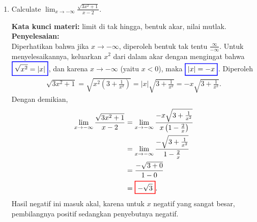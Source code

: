 \documentclass[10pt,openany,a4paper]{article}
\theoremstyle{definition}
\theoremstyle{definition}
\theoremstyle{plain}
\newenvironment{jawab}[2][tes]{%
\par\noindent\textbf{Kata kunci materi:} #1.\\
\textbf{Penyelesaian:} #2%
}{}
\begin{document}
\begin{enumerate}
    \item Calculate $\displaystyle\lim_{x\to-\infty}\frac{\sqrt{3x^2+1}}{x-2}$.
    \begin{jawab}[limit di tak hingga, bentuk akar, nilai mutlak]{~\\
        Diperhatikan bahwa jika $x\to-\infty$, diperoleh bentuk tak tentu $\frac{\infty}{-\infty}$. Untuk menyelesaikannya, keluarkan $x^2$ dari dalam akar dengan mengingat bahwa $\colorlet{oldcolor}{.}
        \color{blue}
        \setlength{\fboxrule}{1pt} \boxed{\color{oldcolor}\sqrt{x^2}=|x|}\color{oldcolor}$, dan karena $x\to-\infty$ (yaitu $x<0$), maka $\colorlet{oldcolor}{.}
        \color{blue}
        \setlength{\fboxrule}{1pt} \boxed{\color{oldcolor}|x|=-x}\color{oldcolor}$. Diperoleh
        \begin{align*}
            \sqrt{3x^2+1} = \sqrt{x^2\left(3+\frac{1}{x^2}\right)} = |x|\sqrt{3+\frac{1}{x^2}} = -x\sqrt{3+\frac{1}{x^2}}.
        \end{align*}
        Dengan demikian,
        \begin{align*}
            \lim_{x\to-\infty}\frac{\sqrt{3x^2+1}}{x-2} &= \lim_{x\to-\infty}\frac{-x\sqrt{3+\frac{1}{x^2}}}{x\left(1-\frac{2}{x}\right)}\\
            &= \lim_{x\to-\infty}\frac{-\sqrt{3+\frac{1}{x^2}}}{1-\frac{2}{x}}\\
            &= \frac{-\sqrt{3+0}}{1-0}\\
            &= \colorlet{oldcolor}{.}
        \color{red}
        \setlength{\fboxrule}{1pt} \boxed{\color{oldcolor}-\sqrt{3}}\color{oldcolor}.
        \end{align*}
        Hasil negatif ini masuk akal, karena untuk $x$ negatif yang sangat besar, pembilangnya positif sedangkan penyebutnya negatif.
    }
    \end{jawab}


\end{enumerate}
\end{document}
